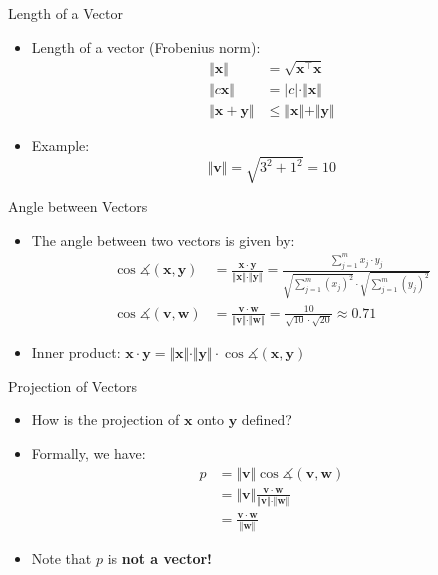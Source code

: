 \begin{frame}{Length of a Vector}{}
	\begin{itemize}
		\item Length of a vector (Frobenius norm):
		\begin{align}
			\Vert \bm{x} \Vert
				&= \sqrt{\bm{x}^{\intercal} \bm{x}}		\\[1mm]
			\Vert c \bm{x} \Vert
				&= \vert c \vert \cdot \Vert \bm{x} \Vert	\\[1mm]
			\Vert \bm{x} + \bm{y} \Vert
				&\le \Vert \bm{x} \Vert + \Vert \bm{y} \Vert
		\end{align}
		\item Example:
		\begin{equation*}
			\Vert \bm{v} \Vert = \sqrt{3^2 + 1^2} = 10
		\end{equation*}
	\end{itemize}
\end{frame}


\begin{frame}{Angle between Vectors}{}
	\begin{itemize}
		\item The angle between two vectors is given by:
		\begin{align}
			\cos \measuredangle (\bm{x}, \bm{y}) &= \frac{\bm{x} \cdot \bm{y}}{\Vert \bm{x} \Vert \cdot \Vert \bm{y} \Vert}
				= \frac{\sum_{j=1}^m x_j \cdot y_j}{\sqrt{\sum_{j=1}^m (x_j)^2} \cdot \sqrt{\sum_{j=1}^m (y_j)^2}} \\[3mm]
			\nonumber
			\cos \measuredangle (\bm{v}, \bm{w}) &= \frac{\bm{v} \cdot \bm{w}}{\Vert \bm{v} \Vert \cdot \Vert \bm{w} \Vert}
				= \frac{10}{\sqrt{10} \cdot \sqrt{20}} \approx 0.71
		\end{align}
		\vspace*{1mm}
		\item Inner product: $\bm{x} \cdot \bm{y}
			= \Vert \bm{x} \Vert \cdot \Vert \bm{y} \Vert \cdot \cos \measuredangle (\bm{x}, \bm{y})$
	\end{itemize}
\end{frame}


\begin{frame}{Projection of Vectors}{}
	\begin{itemize}
		\item How is the projection of $\bm{x}$ onto $\bm{y}$ defined?
		\item Formally, we have:
		\begin{align}
			\nonumber
			p 	&= \Vert \bm{v} \Vert \cos \measuredangle (\bm{v}, \bm{w}) 							\\[1mm]
			\nonumber
				&= \Vert \bm{v} \Vert \frac{\bm{v} \cdot \bm{w}}{\Vert \bm{v} \Vert \cdot \Vert \bm{w} \Vert} 	\\[1mm]
				&= \frac{\bm{v} \cdot \bm{w}}{\Vert \bm{w} \Vert}
		\end{align}
		\item Note that $p$ is \textbf{not a vector!}
	\end{itemize}
\end{frame}


